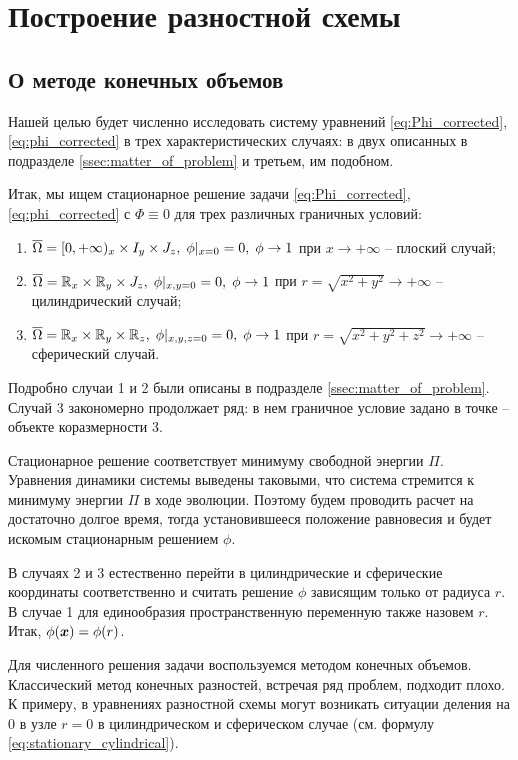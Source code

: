 
\section{Построение разностной схемы}

\subsection{О методе конечных объемов}

Нашей целью будет численно исследовать систему уравнений \eqref{eq:Phi_corrected}, \eqref{eq:phi_corrected} в трех характеристических случаях: в двух описанных в подразделе \ref{ssec:matter_of_problem} и третьем, им подобном.

Итак, мы ищем стационарное решение задачи \eqref{eq:Phi_corrected}, \eqref{eq:phi_corrected} с $\Phi \equiv 0$ для трех различных граничных условий:
\begin{enumerate}
	\item ${\overline{\Omega}} = [0, +\infty)_x \times I_y \times J_z, \; \phi|_{x = 0} = 0, \; \phi \to 1$ при $x \to +\infty$ -- плоский случай;
	\item ${\overline{\Omega}} = {\mathbb{R}}_x \times {\mathbb{R}}_y \times J_z, \; \phi|_{x, y = 0} = 0, \; \phi \to 1$ при $r = \sqrt{x^2 + y^2} \to +\infty$ -- цилиндрический случай;
	\item ${\overline{\Omega}} = {\mathbb{R}}_x \times {\mathbb{R}}_y \times {\mathbb{R}}_z, \; \phi|_{x, y, z = 0} = 0, \; \phi \to 1$ при $r = \sqrt{x^2 + y^2 + z^2} \to +\infty$ -- сферический случай.
\end{enumerate}
Подробно случаи 1 и 2 были описаны в подразделе \ref{ssec:matter_of_problem}. Случай 3 закономерно продолжает ряд: в нем граничное условие задано в точке -- объекте коразмерности 3.

Стационарное решение соответствует минимуму свободной энергии $\Pi$. \linebreak Уравнения динамики системы выведены таковыми, что система стремится к минимуму энергии $\Pi$ в ходе эволюции. Поэтому будем проводить расчет на достаточно долгое время, тогда установившееся положение равновесия и будет искомым стационарным решением $\phi$.

В случаях 2 и 3 естественно перейти в цилиндрические и сферические координаты соответственно и считать решение $\phi$ зависящим только от радиуса $r$. В случае 1 для единообразия пространственную переменную также назовем $r$. Итак, $\phi({\boldsymbol{x}}) = \phi(r)$.

Для численного решения задачи воспользуемся методом конечных объемов. Классический метод конечных разностей, встречая ряд проблем, подходит плохо. К примеру, в уравнениях разностной схемы могут возникать ситуации деления на 0 в узле $r = 0$ в цилиндрическом и сферическом случае (см. формулу \eqref{eq:stationary_cylindrical}).

